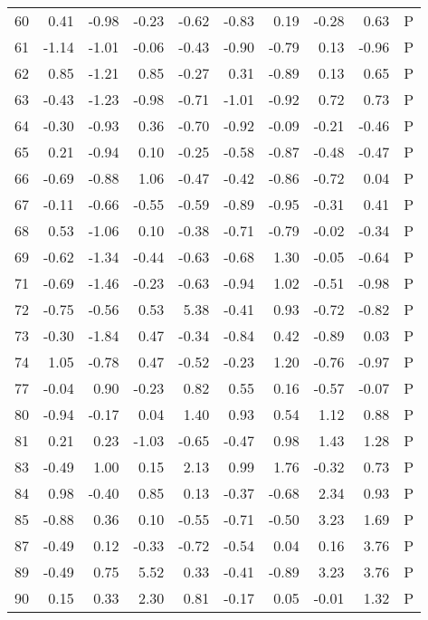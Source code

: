 \begin{table}[ht]
\begin{tabular}{rrrrrrrrrl}
  60 & 0.41 & -0.98 & -0.23 & -0.62 & -0.83 & 0.19 & -0.28 & 0.63 & P \\ 
  61 & -1.14 & -1.01 & -0.06 & -0.43 & -0.90 & -0.79 & 0.13 & -0.96 & P \\ 
  62 & 0.85 & -1.21 & 0.85 & -0.27 & 0.31 & -0.89 & 0.13 & 0.65 & P \\ 
  63 & -0.43 & -1.23 & -0.98 & -0.71 & -1.01 & -0.92 & 0.72 & 0.73 & P \\ 
  64 & -0.30 & -0.93 & 0.36 & -0.70 & -0.92 & -0.09 & -0.21 & -0.46 & P \\ 
  65 & 0.21 & -0.94 & 0.10 & -0.25 & -0.58 & -0.87 & -0.48 & -0.47 & P \\ 
  66 & -0.69 & -0.88 & 1.06 & -0.47 & -0.42 & -0.86 & -0.72 & 0.04 & P \\ 
  67 & -0.11 & -0.66 & -0.55 & -0.59 & -0.89 & -0.95 & -0.31 & 0.41 & P \\ 
  68 & 0.53 & -1.06 & 0.10 & -0.38 & -0.71 & -0.79 & -0.02 & -0.34 & P \\ 
  69 & -0.62 & -1.34 & -0.44 & -0.63 & -0.68 & 1.30 & -0.05 & -0.64 & P \\ 
  71 & -0.69 & -1.46 & -0.23 & -0.63 & -0.94 & 1.02 & -0.51 & -0.98 & P \\ 
  72 & -0.75 & -0.56 & 0.53 & 5.38 & -0.41 & 0.93 & -0.72 & -0.82 & P \\ 
  73 & -0.30 & -1.84 & 0.47 & -0.34 & -0.84 & 0.42 & -0.89 & 0.03 & P \\ 
  74 & 1.05 & -0.78 & 0.47 & -0.52 & -0.23 & 1.20 & -0.76 & -0.97 & P \\ 
  77 & -0.04 & 0.90 & -0.23 & 0.82 & 0.55 & 0.16 & -0.57 & -0.07 & P \\ 
  80 & -0.94 & -0.17 & 0.04 & 1.40 & 0.93 & 0.54 & 1.12 & 0.88 & P \\ 
  81 & 0.21 & 0.23 & -1.03 & -0.65 & -0.47 & 0.98 & 1.43 & 1.28 & P \\ 
  83 & -0.49 & 1.00 & 0.15 & 2.13 & 0.99 & 1.76 & -0.32 & 0.73 & P \\ 
  84 & 0.98 & -0.40 & 0.85 & 0.13 & -0.37 & -0.68 & 2.34 & 0.93 & P \\ 
  85 & -0.88 & 0.36 & 0.10 & -0.55 & -0.71 & -0.50 & 3.23 & 1.69 & P \\ 
  87 & -0.49 & 0.12 & -0.33 & -0.72 & -0.54 & 0.04 & 0.16 & 3.76 & P \\ 
  89 & -0.49 & 0.75 & 5.52 & 0.33 & -0.41 & -0.89 & 3.23 & 3.76 & P \\ 
  90 & 0.15 & 0.33 & 2.30 & 0.81 & -0.17 & 0.05 & -0.01 & 1.32 & P \\ 

\end{tabular}
\end{table}
